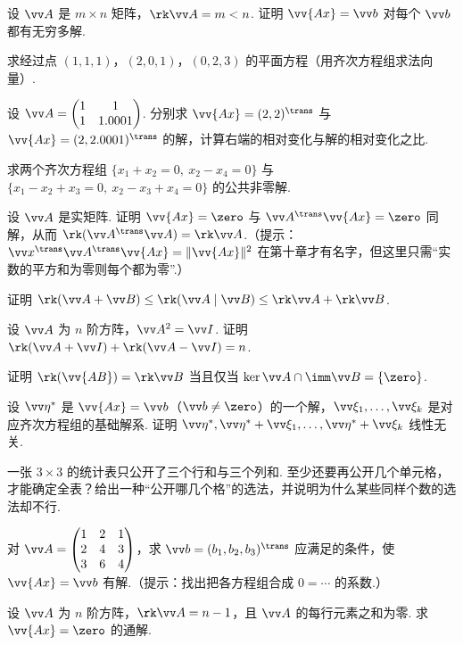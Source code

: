 {\begin{exA}
			\item\label{ex:sol:A18} 设 $\vv A$ 是 $m\times n$ 矩阵，$\rk\vv A=m<n$. 证明 $\vv{Ax}=\vv b$ 对每个 $\vv b$ 都有无穷多解.
			\item\label{ex:sol:A19} 求经过点 $(1,1,1)$，$(2,0,1)$，$(0,2,3)$ 的平面方程（用齐次方程组求法向量）.
			\item\label{ex:sol:A20} 设 $\vv A=\begin{pmatrix}1&1\\1&1.0001\end{pmatrix}$. 分别求 $\vv{Ax}=(2,2)^\trans$ 与 $\vv{Ax}=(2,2.0001)^\trans$ 的解，计算右端的相对变化与解的相对变化之比.
		\end{exA}
		
		\Bgroup
		\begin{exB}
			\item\label{ex:sol:B1} 求两个齐次方程组 $\{x_1+x_2=0,\ x_2-x_4=0\}$ 与 $\{x_1-x_2+x_3=0,\ x_2-x_3+x_4=0\}$ 的公共非零解.
			\item\label{ex:sol:B2} 设 $\vv A$ 是实矩阵. 证明 $\vv{Ax}=\zero$ 与 $\vv A^\trans\vv{Ax}=\zero$ 同解，从而 $\rk(\vv A^\trans\vv A)=\rk\vv A$.（提示：$\vv x^\trans\vv A^\trans\vv{Ax}=\|\vv{Ax}\|^2$ 在第十章才有名字，但这里只需“实数的平方和为零则每个都为零”.）
			\item\label{ex:sol:B3} 证明 $\rk(\vv A+\vv B)\le\rk(\vv A\mid\vv B)\le\rk\vv A+\rk\vv B$.
			\item\label{ex:sol:B4} 设 $\vv A$ 为 $n$ 阶方阵，$\vv A^2=\vv I$. 证明 $\rk(\vv A+\vv I)+\rk(\vv A-\vv I)=n$.
			\item\label{ex:sol:B5} 证明 $\rk(\vv{AB})=\rk\vv B$ 当且仅当 $\ker\vv A\cap\imm\vv B=\{\zero\}$.
			\item\label{ex:sol:B6} 设 $\vv\eta^*$ 是 $\vv{Ax}=\vv b$（$\vv b\ne\zero$）的一个解，$\vv\xi_1,\ldots,\vv\xi_k$ 是对应齐次方程组的基础解系. 证明 $\vv\eta^*,\vv\eta^*+\vv\xi_1,\ldots,\vv\eta^*+\vv\xi_k$ 线性无关.
			\item\label{ex:sol:B7} 一张 $3\times3$ 的统计表只公开了三个行和与三个列和. 至少还要再公开几个单元格，才能确定全表？给出一种“公开哪几个格”的选法，并说明为什么某些同样个数的选法却不行.
			\item\label{ex:sol:B8} 对 $\vv A=\begin{pmatrix}1&2&1\\2&4&3\\3&6&4\end{pmatrix}$，求 $\vv b=(b_1,b_2,b_3)^\trans$ 应满足的条件，使 $\vv{Ax}=\vv b$ 有解.（提示：找出把各方程组合成 $0=\cdots$ 的系数.）
			\item\label{ex:sol:B9} 设 $\vv A$ 为 $n$ 阶方阵，$\rk\vv A=n-1$，且 $\vv A$ 的每行元素之和为零. 求 $\vv{Ax}=\zero$ 的通解.

\end{exB}}
